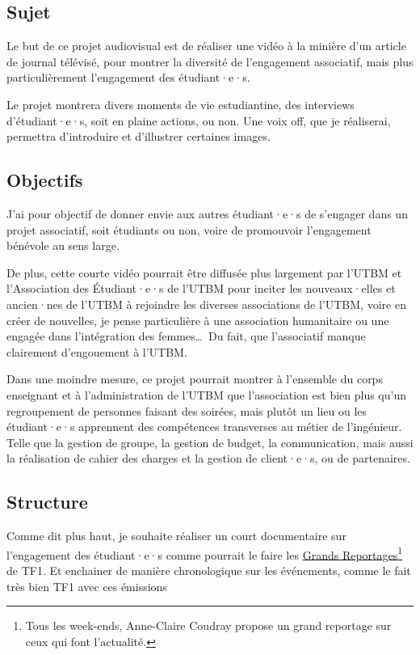 
\subsection{Sujet}\label{subsec:sujet}

Le but de ce projet audiovisual est de réaliser une vidéo à la minière d'un article de journal télévisé, pour montrer la diversité de l'engagement associatif, mais plus particulièrement l'engagement des étudiant·e·s.

Le projet montrera divers moments de vie estudiantine, des interviews d'étudiant·e·s, soit en plaine actions, ou non.
Une voix off, que je réaliserai, permettra d'introduire et d'illustrer certaines images.

\subsection{Objectifs}\label{subsec:objectifs}

J'ai pour objectif de donner envie aux autres étudiant·e·s de s'engager dans un projet associatif, soit étudiants ou non, voire de promouvoir l'engagement bénévole au sens large.

De plus, cette courte vidéo pourrait être diffusée plus largement par l'UTBM et l'Association des Étudiant·e·s de l'UTBM pour inciter les nouveaux·elles et ancien·nes de l'UTBM à rejoindre les diverses associations de l'UTBM, voire en créer de nouvelles, je pense particulière à une association humanitaire ou une engagée dans l'intégration des femmes\ldots \
Du fait, que l'associatif manque clairement d'engouement à l'UTBM.

Dans une moindre mesure, ce projet pourrait montrer à l'ensemble du corps enseignant et à l'administration de l'UTBM que l'association est bien plus qu'un regroupement de personnes faisant des soirées, mais plutôt un lieu ou les étudiant·e·s apprennent des compétences transverses au métier de l'ingénieur.
Telle que la gestion de groupe, la gestion de budget, la communication, mais aussi la réalisation de cahier des charges et la gestion de client·e·s, ou de partenaires.

\subsection{Structure}\label{subsec:structure}

Comme dit plus haut, je souhaite réaliser un court documentaire sur l'engagement des étudiant·e·s comme pourrait le faire les \href{https://www.tf1.fr/tf1/grands-reportages}{Grands Reportages}\footnote{Tous les week-ends, Anne-Claire Coudray propose un grand reportage sur ceux qui font l'actualité.} de TF1.
Et enchainer de manière chronologique sur les événements, comme le fait très bien TF1 avec ces émissions


